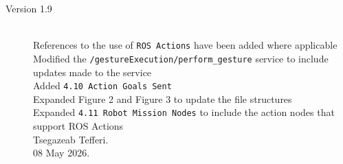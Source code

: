 \documentclass{CSSRforAfrica}
\begin{document}
\begin{description}
\item [Version 1.9]~\\
References to the use of \texttt{\small ROS Actions} have been added where applicable \\
Modified the \texttt{\small /gestureExecution/perform\_gesture} service to include updates made to the service \\
Added \texttt{\small 4.10 Action Goals Sent} \\
Expanded Figure 2 and Figure 3 to update the file structures \\
Expanded \texttt{\small 4.11 Robot Mission Nodes} to include the action nodes that support ROS Actions \\
Tsegazeab Tefferi. \\                            
08 May 2026.

\end{description}
\end{document}
